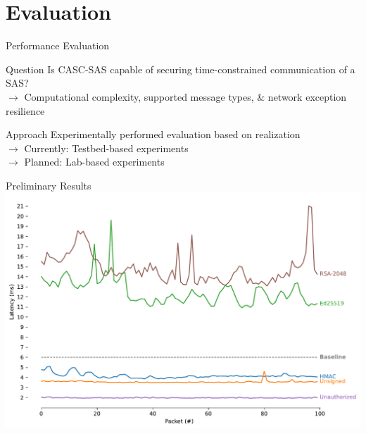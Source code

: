 \documentclass[en]{sdqbeamer}
\begin{document}
\section{Evaluation}
\begin{frame}{Performance Evaluation}
    \begin{greenblock}{Question}
        Is CASC-SAS capable of securing time-constrained communication of a SAS?
        \\$\rightarrow$ Computational complexity, supported message types, \& network exception resilience
    \end{greenblock}
    \begin{blueblock}{Approach}
        Experimentally performed evaluation based on realization
        \\$\rightarrow$ Currently: Testbed-based experiments
        \\$\rightarrow$ Planned: Lab-based experiments
    \end{blueblock}
\end{frame}
\begin{frame}{Preliminary Results}
    \centering
    \includegraphics[height=0.78\textheight]{./figures/rtt-estimation-results.pdf}
\end{frame}
\end{document}

